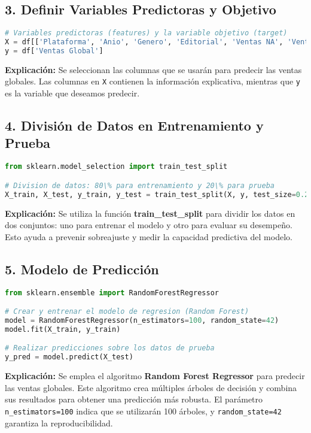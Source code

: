 \documentclass[12pt]{article}
\begin{document}
\subsection{3. Definir Variables Predictoras y Objetivo}
\begin{lstlisting}[language=Python]
# Variables predictoras (features) y la variable objetivo (target)
X = df[['Plataforma', 'Anio', 'Genero', 'Editorial', 'Ventas NA', 'Ventas EU', 'Ventas JP', 'Ventas Otros']]
y = df['Ventas Global']
\end{lstlisting}
\textbf{Explicación:}  
Se seleccionan las columnas que se usarán para predecir las ventas globales. Las columnas en \texttt{X} contienen la información explicativa, mientras que \texttt{y} es la variable que deseamos predecir.

\subsection{4. División de Datos en Entrenamiento y Prueba}
\begin{lstlisting}[language=Python]
from sklearn.model_selection import train_test_split

# Division de datos: 80\% para entrenamiento y 20\% para prueba
X_train, X_test, y_train, y_test = train_test_split(X, y, test_size=0.2, random_state=42)
\end{lstlisting}
\textbf{Explicación:}  
Se utiliza la función \textbf{train\_test\_split} para dividir los datos en dos conjuntos: uno para entrenar el modelo y otro para evaluar su desempeño. Esto ayuda a prevenir sobreajuste y medir la capacidad predictiva del modelo.

\subsection{5. Modelo de Predicción}
\begin{lstlisting}[language=Python]
from sklearn.ensemble import RandomForestRegressor

# Crear y entrenar el modelo de regresion (Random Forest)
model = RandomForestRegressor(n_estimators=100, random_state=42)
model.fit(X_train, y_train)

# Realizar predicciones sobre los datos de prueba
y_pred = model.predict(X_test)
\end{lstlisting}
\textbf{Explicación:}  
Se emplea el algoritmo \textbf{Random Forest Regressor} para predecir las ventas globales. Este algoritmo crea múltiples árboles de decisión y combina sus resultados para obtener una predicción más robusta. El parámetro \texttt{n\_estimators=100} indica que se utilizarán 100 árboles, y \texttt{random\_state=42} garantiza la reproducibilidad.
\end{document}
